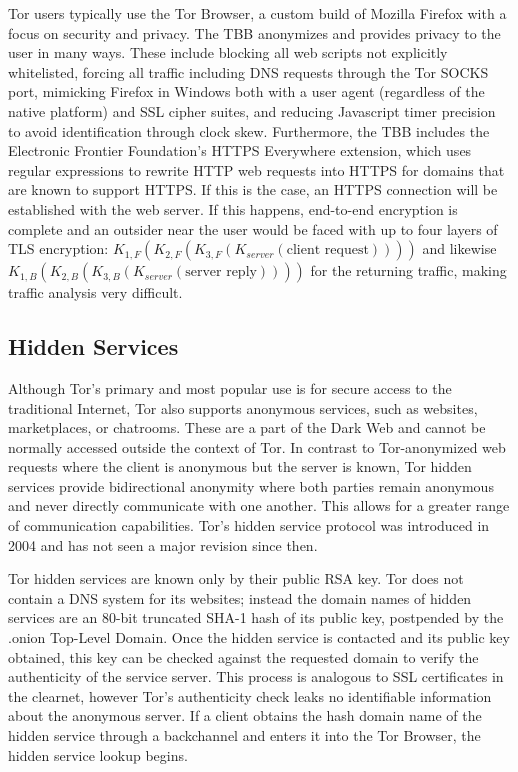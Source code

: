 
Tor users typically use the Tor Browser, a custom build of Mozilla Firefox with a focus on security and privacy. The TBB anonymizes and provides privacy to the user in many ways. These include blocking all web scripts not explicitly whitelisted, forcing all traffic including DNS requests through the Tor SOCKS port, mimicking Firefox in Windows both with a user agent (regardless of the native platform) and SSL cipher suites, and reducing Javascript timer precision to avoid identification through clock skew. Furthermore, the TBB includes the Electronic Frontier Foundation's HTTPS Everywhere extension, which uses regular expressions to rewrite HTTP web requests into HTTPS for domains that are known to support HTTPS. If this is the case, an HTTPS connection will be established with the web server. If this happens, end-to-end encryption is complete and an outsider near the user would be faced with up to four layers of TLS encryption: $K_{1,F}(K_{2,F}(K_{3,F}(K_{server}(\textrm{client\ request}))))$ and likewise $K_{1,B}(K_{2,B}(K_{3,B}(K_{server}(\textrm{server\ reply}))))$ for the returning traffic, making traffic analysis very difficult.

\subsection{Hidden Services}

Although Tor's primary and most popular use is for secure access to the traditional Internet, Tor also supports anonymous services, such as websites, marketplaces, or chatrooms. These are a part of the Dark Web and cannot be normally accessed outside the context of Tor. In contrast to Tor-anonymized web requests where the client is anonymous but the server is known, Tor hidden services provide bidirectional anonymity where both parties remain anonymous and never directly communicate with one another. This allows for a greater range of communication capabilities. Tor's hidden service protocol was introduced in 2004 and has not seen a major revision since then.\cite{NicolussiThesis2011}

Tor hidden services are known only by their public RSA key. Tor does not contain a DNS system for its websites; instead the domain names of hidden services are an 80-bit truncated SHA-1 hash of its public key, postpended by the .onion Top-Level Domain. Once the hidden service is contacted and its public key obtained, this key can be checked against the requested domain to verify the authenticity of the service server. This process is analogous to SSL certificates in the clearnet, however Tor's authenticity check leaks no identifiable information about the anonymous server. If a client obtains the hash domain name of the hidden service through a backchannel and enters it into the Tor Browser, the hidden service lookup begins.

